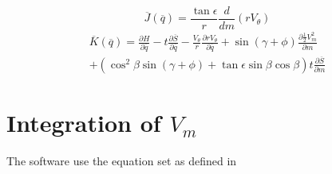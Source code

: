\documentclass{report}
\begin{document}
        \begin{equation}
            \overline{J} \left(\overline{q}\right) = \frac{\tan \epsilon}{r} \frac{d}{dm}\left(rV_{\theta}\right)
        \end{equation}
        \begin{equation}
            \begin{multlined}
                \overline{K} \left(\overline{q}\right) = \frac{\partial H}{\partial \overline{q}} - t \frac{\partial \overline{S}}{\partial \overline{q}} - \frac{V_{\theta}}{r} \frac{\partial rV_{\theta}}{\partial \overline{q}} + 
                \sin \left(\gamma + \phi\right) \frac{\partial \frac{1}{2}V_m^2}{\partial m} \\
                + \left(\cos^2 \beta \sin \left(\gamma + \phi \right) +  \tan \epsilon \sin \beta \cos \beta \right) t \frac{\partial \overline{S}}{\partial m}
            \end{multlined}
        \end{equation}
    \chapter{Integration of \(V_m\)}
    
    The software use the equation set as defined in \cite{Novak77}
    
    
\end{document}
